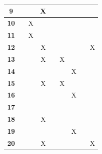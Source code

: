 \documentclass[12pt, titlepage]{article}
\begin{document}
\begin{table}
\begin{tabular}{|c|c|c|c|c|c|c|c|c|}
    \textbf{9}  &                     &                     & X                    &                     &                       &                       &                       & \\ \hline
    \textbf{10} &                     &  X                   &                     &                     &                   &                  &                       & \\ \hline
\textbf{11} &                     & X                    &                     &                     &                   &                  &                       & \\ \hline
\textbf{12} &                     &                     &        X             &                     &                   &                  &                       & X\\ \hline
\textbf{13} &                     &                     &       X              &                     &        X           &                  &                       & \\ \hline
\textbf{14} &                     &                     &                     &                     &                   &     X             &                       & \\ \hline
\textbf{15} &                     &                     &            X         &                     &     X              &                  &                       & \\ \hline
\textbf{16} &                     &                     &                     &                     &                   &        X          &                       & \\ \hline
\textbf{17} &                     &                     &                     &                     &                   &                  &                       & \\ \hline
\textbf{18} &                     &                     &   X                  &                     &                   &                  &                       & \\ \hline
\textbf{19} &                     &                     &                     &                     &                   &       X           &                       & \\ \hline
\textbf{20} &                     &                     &        X             &                     &                   &                  &                       &X\\ \hline

\end{tabular}
\end{table}
\end{document}
